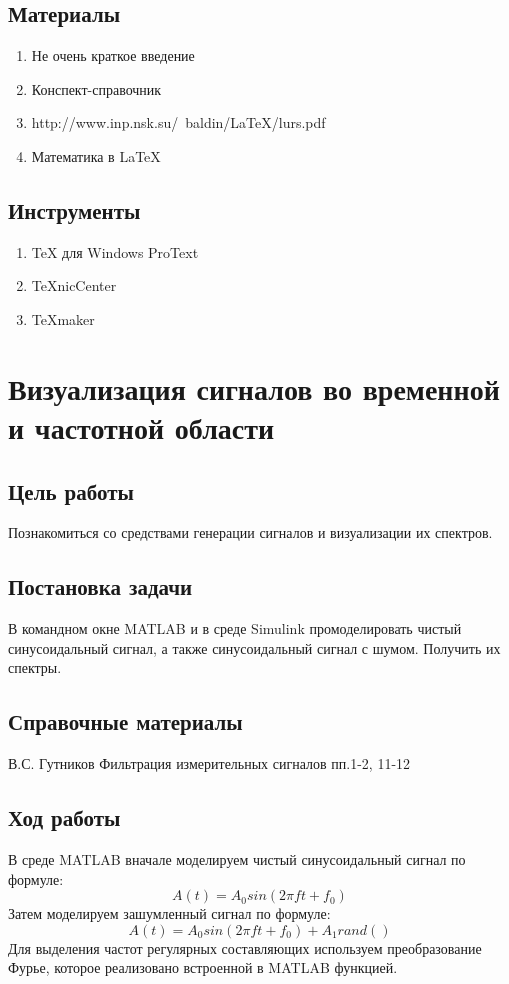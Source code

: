 \documentclass[10pt,a4paper]{article}
\begin{document}
\subsection{Материалы}
\begin{enumerate}
\item Не очень краткое введение
\item Конспект-справочник
\item http://www.inp.nsk.su/~baldin/LaTeX/lurs.pdf
\item Математика в \LaTeX
\end{enumerate}
\subsection{Инструменты}
\begin{enumerate}
\item TeX для Windows ProText
\item TeXnicCenter
\item TeXmaker
\end{enumerate}
\section{Визуализация сигналов во временной и частотной области}
\subsection{Цель работы}
Познакомиться со средствами генерации сигналов и визуализации их спектров.
\subsection{Постановка задачи}
В командном окне MATLAB и в среде Simulink промоделировать чистый синусоидальный сигнал, а также синусоидальный сигнал с шумом. Получить их спектры.
\subsection{Справочные материалы}
В.С. Гутников Фильтрация измерительных сигналов пп.1-2, 11-12
\subsection{Ход работы}
В среде MATLAB вначале моделируем чистый синусоидальный сигнал по формуле:
\begin{displaymath}
A(t) = A_0sin(2\pi ft + f_0)
\end{displaymath}
Затем моделируем зашумленный сигнал по формуле:
\begin{displaymath}
A(t) = A_0sin(2\pi ft + f_0) + A_1 rand()
\end{displaymath}
Для выделения частот регулярных составляющих используем преобразование Фурье, которое реализовано встроенной в MATLAB функцией.
\end{document}
